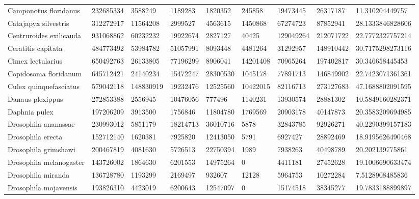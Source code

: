 \begin{table}[]
\begin{tabular}{@{}lllllllll@{}}
Camponotus floridanus      & 232685334   & 3588249   & 1189283   & 1820352   & 245858    & 19473445   & 26317187   & 11.310204449757   \\
Catajapyx silvestris       & 312272917   & 11564208  & 2999527   & 4563615   & 1450868   & 67274723   & 87852941   & 28.1333846828606  \\
Centruroides exilicauda    & 931068862   & 60232232  & 19922674  & 2827127   & 40425     & 129049264  & 212071722  & 22.7772327757214  \\
Ceratitis capitata         & 484773492   & 53984782  & 51057991  & 8093448   & 4481264   & 31292957   & 148910442  & 30.7175298273116  \\
Cimex lectularius          & 650492763   & 26133805  & 77196299  & 8906041   & 14201408  & 70965264   & 197402817  & 30.346658445453   \\
Copidosoma floridanum      & 645712421   & 24140234  & 15472247  & 28300530  & 1045178   & 77891713   & 146849902  & 22.7423071361361  \\
Culex quinquefasciatus     & 579042118   & 148830919 & 19232476  & 12525560  & 10422015  & 82116713   & 273127683  & 47.1688802091595  \\
Danaus plexippus           & 272853388   & 2556945   & 10476056  & 777496    & 1140231   & 13930574   & 28881302   & 10.5849160282371  \\
Daphnia pulex              & 197206209   & 3913500   & 1756846   & 11804780  & 1769569   & 20903178   & 40147873   & 20.3583209694985  \\
Drosophila ananassae       & 230993012   & 5851179   & 18214713  & 36010716  & 5878      & 32843785   & 92926271   & 40.2290399157183  \\
Drosophila erecta          & 152712140   & 1620381   & 7925820   & 12413050  & 5791      & 6927427    & 28892469   & 18.9195626490468  \\
Drosophila grimshawi       & 200467819   & 4081630   & 5726513   & 22750394  & 1989      & 7938263    & 40498789   & 20.202139775861   \\
Drosophila melanogaster    & 143726002   & 1864630   & 6201553   & 14975264  & 0         & 4411181    & 27452628   & 19.1006690633474  \\
Drosophila miranda         & 136728780   & 1193299   & 2169497   & 932607    & 12128     & 5964753    & 10272284   & 7.5128908485836   \\
Drosophila mojavensis      & 193826310   & 4423019   & 6200643   & 12547097  & 0         & 15174518   & 38345277   & 19.7833188899897  \\

\end{tabular}
\end{table}
